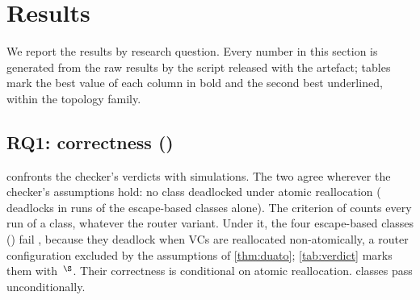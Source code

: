 \section{Results}
\label{sec:results}

We report the results by research question. Every number in this section is generated from the raw results by the script released with the artefact; tables mark the best value of each column in bold and the second best underlined, within the topology family.

\subsection{RQ1: correctness ()}
\label{sec:rq-correct}

 confronts the checker's verdicts with  simulations. The two agree wherever the checker's assumptions hold: no class deadlocked under atomic reallocation ( deadlocks in  runs of the escape-based classes alone). The criterion of  counts every run of a class, whatever the router variant. Under it, the four escape-based classes () fail , because they deadlock when VCs are reallocated non-atomically, a router configuration excluded by the assumptions of \cref{thm:duato}; \cref{tab:verdict} marks them with~$^{\S}$. Their correctness is conditional on atomic reallocation.  classes pass unconditionally.

\begin{table}[tbp]
\centering
\caption{Correctness (). Deadlocked runs over all groups, separated by VC reallocation policy (non-atomic runs: non-atomic variant of the sensitivity group; --: no run).}
\label{tab:d1}
\small

\end{table}

